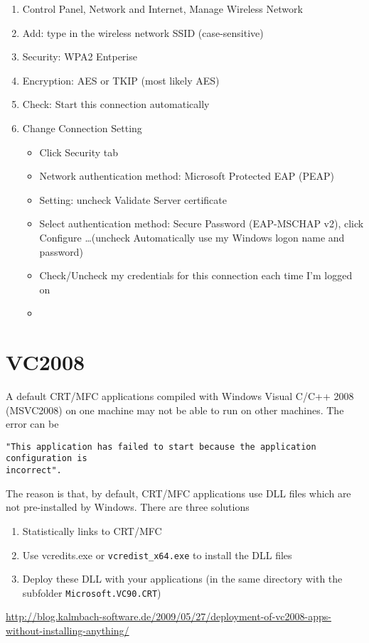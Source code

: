 \begin{enumerate}
  \item Control Panel, Network and Internet, Manage Wireless Network
  \item Add: type in the wireless network SSID (case-sensitive)
  \item Security: WPA2 Entperise
  \item Encryption: AES or TKIP (most likely AES)
  \item Check: Start this connection automatically
  \item Change Connection Setting
  \begin{itemize}
    \item Click Security tab
    \item Network authentication method: Microsoft Protected EAP (PEAP)
    \item Setting: uncheck Validate Server certificate
    \item Select authentication method: Secure Password (EAP-MSCHAP
    v2), click Configure \ldots (uncheck Automatically use my Windows logon name
    and password)
    \item Check/Uncheck my credentials for this connection each time I'm logged
    on
    \item 
  \end{itemize}
\end{enumerate}


\section{VC2008}	


A default CRT/MFC applications compiled with Windows Visual C/C++ 2008
(MSVC2008) on one machine may not be able to run on other machines. The error
can be
\begin{verbatim}
"This application has failed to start because the application configuration is
incorrect".
\end{verbatim}

The reason is that, by default, CRT/MFC applications use DLL files which are not
pre-installed by Windows. There are three solutions
\begin{enumerate}
  \item Statistically links to CRT/MFC
  \item Use vcredits.exe or \verb!vcredist_x64.exe! to install the DLL files
  \item Deploy these DLL with your applications (in the same directory with the
  subfolder \verb!Microsoft.VC90.CRT!)
\end{enumerate}
\url{http://blog.kalmbach-software.de/2009/05/27/deployment-of-vc2008-apps-without-installing-anything/}

